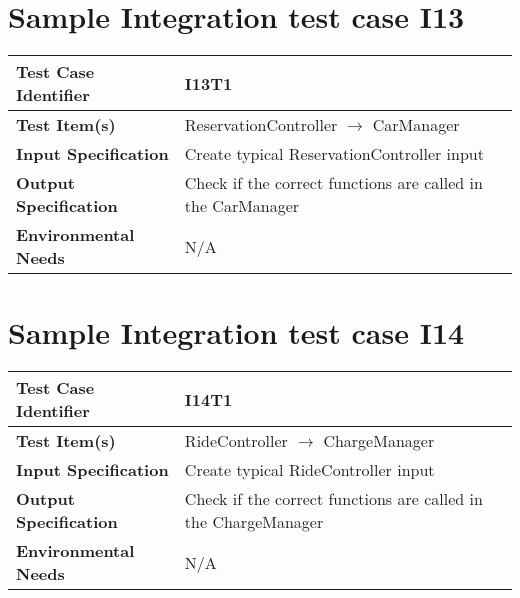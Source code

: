 \section{Sample Integration test case I13}\label{I13}
\begin{center}
	\vspace{0.6cm}
	\begin{tabular}{|l|l|}
		\hline
		\textbf{Test Case Identifier} & I13T1 \bigstrut \\\hline
		\textbf{Test Item(s)} & ReservationController \ensuremath{\rightarrow} CarManager \bigstrut \\\hline
		\textbf{Input Specification} & Create typical ReservationController input \bigstrut \\\hline
		\textbf{Output Specification} & Check if the correct functions are called in the CarManager \bigstrut \\\hline
		\textbf{Environmental Needs} & N/A \bigstrut \\\hline
	\end{tabular}
\end{center}

\section{Sample Integration test case I14}\label{I14}
\begin{center}
	\vspace{0.6cm}
	\begin{tabular}{|l|l|}
		\hline
		\textbf{Test Case Identifier} & I14T1 \bigstrut \\\hline
		\textbf{Test Item(s)} & RideController \ensuremath{\rightarrow} ChargeManager \bigstrut \\\hline
		\textbf{Input Specification} & Create typical RideController input \bigstrut \\\hline
		\textbf{Output Specification} & Check if the correct functions are called in the ChargeManager \bigstrut \\\hline
		\textbf{Environmental Needs} & N/A \bigstrut \\\hline
	\end{tabular}
\end{center}

